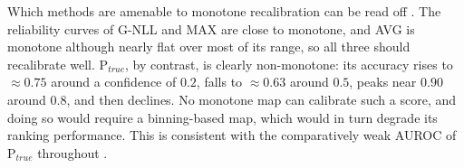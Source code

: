 Which methods are amenable to monotone recalibration can be read off . The reliability curves of {G-NLL} and {MAX} are close to monotone, and {AVG} is monotone although nearly flat over most of its range, so all three should recalibrate well. {P}$_{true}$, by contrast, is clearly non-monotone: its accuracy rises to $\approx\!0.75$ around a confidence of $0.2$, falls to $\approx\!0.63$ around $0.5$, peaks near $0.90$ around $0.8$, and then declines. No monotone map can calibrate such a score, and doing so would require a binning-based map, which would in turn degrade its ranking performance. This is consistent with the comparatively weak AUROC of {P}$_{true}$ throughout .
